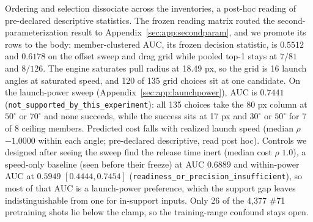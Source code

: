 Ordering and selection dissociate across the inventories, a post-hoc reading of pre-declared descriptive statistics. The frozen reading matrix routed the second-parameterization result to Appendix~\ref{sec:app:secondparam}, and we promote its rows to the body: member-clustered AUC, its frozen decision statistic, is $0.5512$ and $0.6178$ on the offset sweep and drag grid while pooled top-1 stays at $7/81$ and $8/126$. The engine saturates pull radius at 18.49 px, so the grid is 16 launch angles at saturated speed, and 120 of 135 grid choices sit at one candidate. On the launch-power sweep (Appendix~\ref{sec:app:launchpower}), AUC is $0.7441$ (\texttt{not\_supported\_by\_this\_experiment}): all 135 choices take the 80 px column at $50^\circ$ or $70^\circ$ and none succeeds, while the success sits at 17 px and $30^\circ$ or $50^\circ$ for 7 of 8 ceiling members. Predicted cost falls with realized launch speed (median $\rho$ $-1.0000$ within each angle; pre-declared descriptive, read post hoc). Controls we designed after seeing the sweep find the release time inert (median cost $\rho$ $1.0$), a speed-only baseline (seen before their freeze) at AUC $0.6889$ and within-power AUC at $0.5949$ $[0.4444, 0.7454]$ (\texttt{readiness\_or\_precision\_insufficient}), so most of that AUC is a launch-power preference, which the support gap leaves indistinguishable from one for in-support inputs. Only 26 of the 4,377 \#71 pretraining shots lie below the clamp, so the training-range confound stays open. %

